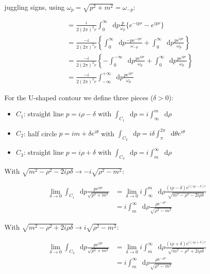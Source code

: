 \documentclass[aspectratio=169]{beamer}
\newcommand{\sqrtpm}{\sqrt{p^2 + m^2}}
\newcommand{\integrand}{\frac{p e^{ipr}}{\sqrt{p^2 + m^2}}}
\newcommand{\omp}{\omega_{p}}
\newcommand{\ommp}{\omega_{-p}}
\newcommand{\diffop}{\mathop{}\!\mathrm{d}}
\newcommand{\dip}{\diffop p}
\newcommand{\drho}{\diffop \rho}
\newcommand{\dtheta}{\diffop \theta}
\newcommand{\intii}{\int_{-\infty}^{+\infty}}
\newcommand{\limdel}{\lim_{\delta \to 0}}
\begin{document}
\begin{frame}

juggling signs, using $\omp = \sqrtpm = \ommp$:

\begin{equation*}
\begin{split}
& = \frac{i}{2(2\pi)^2 r} \int_0^\infty \dip \frac{p}{\omp} \big\{ e^{-ipr} - e^{ipr} \big\} \\
& = \frac{-i}{2(2\pi)^2 r} \left\{ \int_0^\infty \dip \frac{-p e^{-ipr}}{\ommp} + \int_0^\infty \dip \frac{p e^{ipr}}{\omp} \right\} \\
& = \frac{-i}{2(2\pi)^2 r} \left\{ -\int_0^{-\infty} \dip \frac{p e^{ipr}}{\omp} + \int_0^\infty \dip \frac{p e^{ipr}}{\omp} \right\} \\
& = \frac{-i}{2(2\pi)^2 r} \intii \dip \frac{p e^{ipr}}{\omp}
\end{split}
\end{equation*}
\end{frame}


\begin{frame}
For the U-shaped contour we define three pieces ($\delta > 0$):
\begin{itemize}
\item $C_1$: straight line $p = i\rho - \delta$ with $\int_{C_1} \dip = i \int_\infty^m \drho$
\item $C_2$: half circle $p = im + \delta e^{i\theta}$ with $\int_{C_2} \dip = i\delta \int_\pi^{2\pi} \dtheta e^{i\theta}$
\item $C_3$: straight line $p = i\rho + \delta$ with $\int_{C_3} \dip = i \int_m^\infty \drho$
\end{itemize}
\end{frame}


\begin{frame}

With $\sqrt{m^2 - \rho^2 - 2i\rho\delta} \to -i \sqrt{\rho^2 - m^2}$:

\begin{equation*}
\begin{split}
\limdel \int_{C_1} \dip \integrand &= \limdel i \int_\infty^m \drho \frac{(i\rho - \delta)e^{i(i\rho - \delta)r}}{\sqrt{m^2 - \rho^2 - 2i\rho\delta}} \\
&= i \int_m^\infty \drho \frac{\rho e^{-\rho r}}{\sqrt{\rho^2 - m^2}}
\end{split}
\end{equation*}

With $\sqrt{m^2 - \rho^2 + 2i\rho\delta} \to i \sqrt{\rho^2 - m^2}$:

\begin{equation*}
\begin{split}
\limdel \int_{C_3} \dip \integrand &= \limdel i \int_m^\infty \drho \frac{(i\rho + \delta)e^{i(i\rho + \delta)r}}{\sqrt{m^2 - \rho^2 + 2i\rho\delta}} \\
&= i \int_m^\infty \drho \frac{\rho e^{-\rho r}}{\sqrt{\rho^2 - m^2}}
\end{split}
\end{equation*}
\end{frame}
\end{document}
